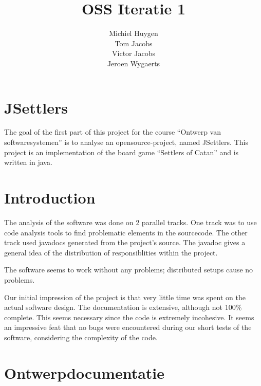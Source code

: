 \documentclass[pdftex12pt, a4paper]{article}
\begin{document}
\begin{titlepage}

\title{OSS Iteratie 1}
\author{Michiel Huygen\\Tom Jacobs\\Victor Jacobs\\Jeroen Wygaerts}

\maketitle
\thispagestyle{empty}

\end{titlepage}

\newpage

\tableofcontents

\newpage


\section*{JSettlers}

The goal of the first part of this project for the course ``Ontwerp van softwaresystemen'' is to analyse an opensource-project, named JSettlers. 
This project is an implementation of the board game ``Settlers of Catan'' and is written in java.

\section{Introduction}
The analysis of the software was done on 2 parallel tracks. 
One track was to use code analysis tools to find problematic elements in the sourcecode. 
The other track used javadocs generated from the project's source. 
The javadoc gives a general idea of the distribution of responsiblities within the project.

The software seems to work without any problems; distributed setups cause no problems.

Our initial impression of the project is that very little time was spent on the actual software design. 
The documentation is extensive, although not 100\% complete. 
This seems necessary since the code is extremely incohesive. 
It seems an impressive feat that no bugs were encountered during our short tests of the software, considering the complexity of the code. 


\section{Ontwerpdocumentatie}
\end{document}
